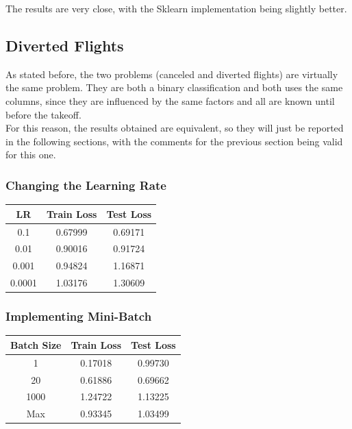 \documentclass[
	letterpaper, %
	10pt, %
]{class}
\begin{document}
The results are very close, with the Sklearn implementation being slightly better.

\subsection{Diverted Flights}

As stated before, the two problems (canceled and diverted flights) are virtually the same problem. They are both a binary classification and both uses the same columns, since they are influenced by the same factors and all are known until before the takeoff.\\

For this reason, the results obtained are equivalent, so they will just be reported in the following sections, with the comments for the previous section being valid for this one.

\subsubsection{Changing the Learning Rate}

\begin{center}
  \begin{tabular}{ |c|c|c| }
    \hline
    LR     & Train Loss & Test Loss \\
    \hline
    0.1    & 0.67999    & 0.69171   \\
    0.01   & 0.90016    & 0.91724   \\
    0.001  & 0.94824    & 1.16871   \\
    0.0001 & 1.03176    & 1.30609   \\
    \hline
  \end{tabular}
\end{center}

\subsubsection{Implementing Mini-Batch}

\begin{center}
  \begin{tabular}{ |c|c|c| }
    \hline
    Batch Size & Train Loss & Test Loss \\
    \hline
    1          & 0.17018    & 0.99730   \\
    20         & 0.61886    & 0.69662   \\
    1000       & 1.24722    & 1.13225   \\
    Max        & 0.93345    & 1.03499   \\
    \hline
  \end{tabular}
\end{center}
\end{document}
